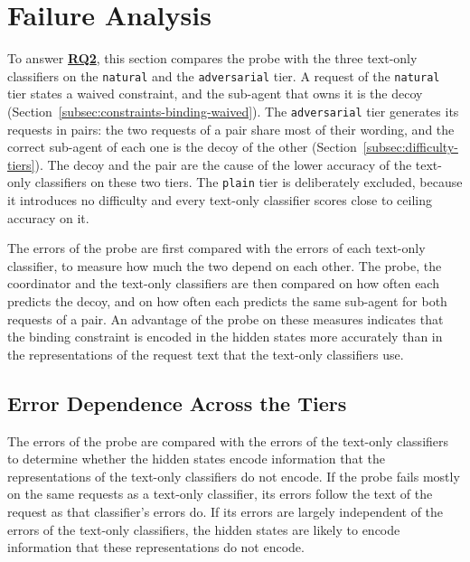 \section{Failure Analysis}
\label{sec:ch8-failure-analysis}

\label{rq:ch8-rq2-intro}


\noindent To answer \hyperref[rq:ch8-rq2-intro]{\textbf{RQ2}}, this section compares the probe with the three text-only classifiers on the \texttt{natural} and the \texttt{adversarial} tier. A request of the \texttt{natural} tier states a waived constraint, and the sub-agent that owns it is the decoy (Section~\ref{subsec:constraints-binding-waived}). The \texttt{adversarial} tier generates its requests in pairs: the two requests of a pair share most of their wording, and the correct sub-agent of each one is the decoy of the other (Section~\ref{subsec:difficulty-tiers}). The decoy and the pair are the cause of the lower accuracy of the text-only classifiers on these two tiers. The \texttt{plain} tier is deliberately excluded, because it introduces no difficulty and every text-only classifier scores close to ceiling accuracy on it.

The errors of the probe are first compared with the errors of each text-only classifier, to measure how much the two depend on each other. The probe, the coordinator and the text-only classifiers are then compared on how often each predicts the decoy, and on how often each predicts the same sub-agent for both requests of a pair. An advantage of the probe on these measures indicates that the binding constraint is encoded in the hidden states more accurately than in the representations of the request text that the text-only classifiers use.

\subsection{Error Dependence Across the Tiers}
\label{subsec:ch8-failure-dependence}

The errors of the probe are compared with the errors of the text-only classifiers to determine whether the hidden states encode information that the representations of the text-only classifiers do not encode. If the probe fails mostly on the same requests as a text-only classifier, its errors follow the text of the request as that classifier's errors do. If its errors are largely independent of the errors of the text-only classifiers, the hidden states are likely to encode information that these representations do not encode.

